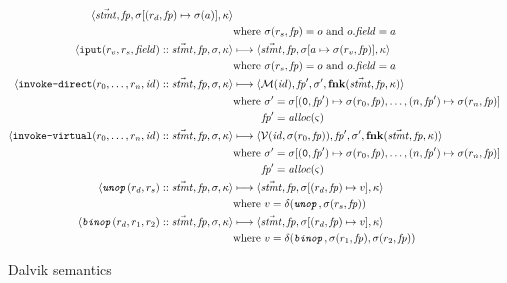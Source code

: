 \documentclass{article}
\newcommand\code[1]{\text{\tt{#1}}}
\newcommand\reg[2]{(#1,#2)}
\newcommand\fp{\mathit{fp}}
\newcommand\fnk{\mathbf{fnk}}
\newcommand\kont{\kappa}
\newcommand\stmts{\vec{\mathit{stmt}}}
\newcommand\store{\sigma}
\newcommand\addr{a}
\newcommand\regid{r}
\newcommand\methodStmts{\mathcal{M}}
\newcommand\virtualStmts{\mathcal{V}}
\newcommand\alloc{\mathit{alloc}}
\newcommand\field{\mathit{field}}
\newcommand\state{\varsigma}
\newcommand\obj{o}
\newcommand\val{v}
\begin{document}
\begin{figure}
\begin{align*}
\langle \stmts,\fp,\store[\reg{\regid_d}\fp \mapsto \store(\addr) ],\kont\rangle
\\
&\mbox{where }\store\reg{\regid_s}\fp = \obj
\mbox{ and }o.\field = \addr
\\
\langle \code{iput}(\regid_v,\regid_s,\field)::\stmts,\fp,\store,\kont\rangle
&\longmapsto
\langle \stmts,\fp,\store[\addr \mapsto \store\reg{\regid_v}\fp],\kont\rangle 
\\
&\mbox{where }\store\reg{\regid_s}\fp = \obj
\mbox{ and }\obj.\field = \addr
\\
\langle \code{invoke-direct}(\regid_0,\dots,\regid_n,\mathit{id})::\stmts,\fp,\store,\kont\rangle
& \longmapsto
\langle \methodStmts(\mathit{id}), \fp', 
\store', \fnk(\stmts,\fp,\kont)\rangle
\\
&
\begin{aligned}
\mbox{where } \store' &=
\store[\reg{\code{0}}{\fp'}
  \mapsto \store\reg{\regid_0}\fp,\dots,\reg{n}{\fp'} \mapsto  \store{\reg{\regid_n}\fp}]
\\
\fp' &= \alloc(\state)
\end{aligned}
\\
\langle \code{invoke-virtual}(\regid_0,\dots,\regid_n,\mathit{id})::\stmts,\fp,\store,\kont\rangle
& \longmapsto
\langle \virtualStmts(\mathit{id},\store\reg{\regid_0}\fp), \fp', 
\store', \fnk(\stmts,\fp,\kont)\rangle
\\
&
\begin{aligned}
\mbox{where } \store' &=
\store[\reg{\code{0}}{\fp'}
  \mapsto \store\reg{\regid_0}\fp,\dots,\reg{n}{\fp'} \mapsto  \store{\reg{\regid_n}\fp}]
\\
\fp' & = \alloc(\state)
\end{aligned}
\\
\langle \code{\emph{unop}}(\regid_d,\regid_s)::\stmts,\fp,\store,\kont \rangle
& \longmapsto
\langle \stmts,\fp,\store[\reg{\regid_d}\fp \mapsto \val], \kont\rangle
\\
&\text{where }\val = \delta(\code{\emph{unop}},\store\reg{\regid_s}\fp)
\\
\langle \code{\emph{binop}}(\regid_d,\regid_1,\regid_2)::\stmts,\fp,\store,\kont \rangle
& \longmapsto
\langle \stmts,\fp,\store[\reg{\regid_d}\fp \mapsto \val], \kont\rangle
\\
&\text{where }\val = \delta(\code{\emph{binop}},\store\reg{\regid_1}\fp, \store\reg{\regid_2}\fp)
\end{align*}
\caption{Dalvik semantics}
\end{figure}
\end{document}
